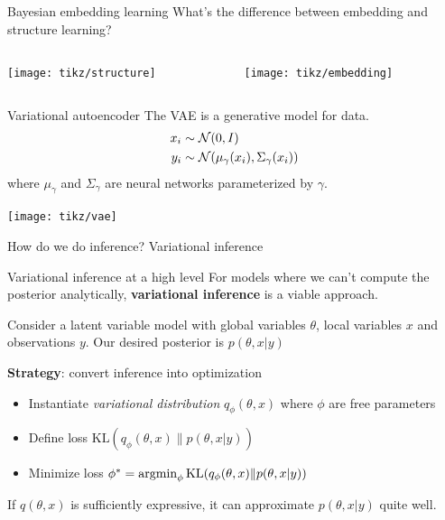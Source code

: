 \documentclass[10pt, compress]{beamer}
\begin{document}
\begin{frame}{Bayesian embedding learning}
  \centering
  What's the difference between embedding and structure learning?
  \pause
  \begin{center}
    \begin{columns}
      \begin{column}{0.3\textwidth}
        \texttt{[image: tikz/structure]}
      \end{column}
    \pause
      \begin{column}{0.3\textwidth}
        \texttt{[image: tikz/embedding]}
      \end{column}
    \end{columns}
  \end{center}
\end{frame}
\begin{frame}{Variational autoencoder}
  The VAE is a generative model for data.
  \begin{align*}
    x_i &\sim  \mathcal{N}(0, I) \\
    y_i &\sim  \mathcal{N}(\mu_\gamma(x_i), \Sigma_\gamma(x_i))
  \end{align*}
  where $\mu_\gamma$ and $\Sigma_\gamma$ are neural networks parameterized by $\gamma$.

  \pause
  \centering
  \texttt{[image: tikz/vae]}
  \pause
   
  How do we do inference?
  \alert<+>{Variational inference}
\end{frame}

\begin{frame}{Variational inference at a high level}
  For models where we can't compute
  the posterior analytically, \textbf{variational inference}
  is a viable approach.

  \pause
    Consider a latent variable model with global variables
    $\theta$, local variables $x$ and observations $y$. Our desired
    posterior is $p(\theta, x | y)$

    \pause
    \textbf{Strategy}: convert inference into optimization
    \begin{itemize}
        \pause
      \item Instantiate \emph{variational distribution} $q_\phi(\theta, x)$
        where $\phi$ are free parameters
        \pause
      \item Define loss $\textrm{KL}(q_\phi(\theta, x)\|p(\theta, x | y))$
        \pause
      \item Minimize loss $\phi^* = \operatorname*{argmin}_\phi \textrm{KL}(q_\phi(\theta, x)\|p(\theta, x | y))$
    \end{itemize}
    \pause
    If $q(\theta, x)$ is sufficiently expressive,
    it can approximate $p(\theta, x | y)$ quite well.
\end{frame}
\end{document}
